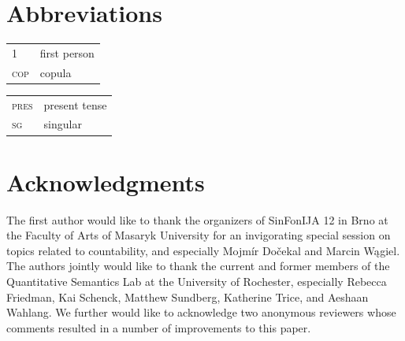 \documentclass[output=paper]{langscibook}
\begin{document}



\section*{Abbreviations}

\begin{tabularx}{.5\textwidth}{@{}lX@{}}
\textsc{1}&first person\\
\textsc{cop}&{copula}\\
\end{tabularx}%
\begin{tabularx}{.5\textwidth}{@{}lX@{}}
\textsc{pres}&{present tense}\\
\textsc{sg}&singular\\
\end{tabularx}

\fi 

\section*{Acknowledgments}
The first author would like to thank the organizers of SinFonIJA 12 in Brno at the Faculty of Arts of Masaryk University for an invigorating special session on topics related to countability, and especially Mojmír Dočekal   and Marcin Wągiel.  The authors jointly would like to thank the current and former members of the Quantitative Semantics Lab at the University of Rochester, especially  Rebecca Friedman, Kai Schenck, Matthew Sundberg, Katherine Trice, and Aeshaan Wahlang. We further would like to acknowledge two anonymous reviewers whose comments resulted in a number of improvements to this paper.


{\sloppy\printbibliography[heading=subbibliography,notkeyword=this]}
\end{document}
